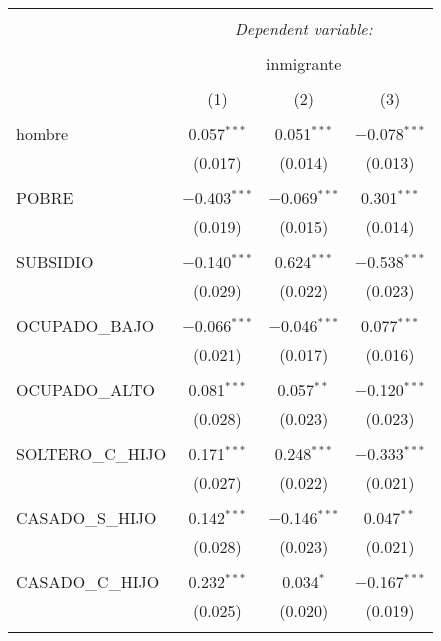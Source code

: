 \documentclass[10pt,a4paper]{book}
\begin{document}
\begin{table}[!htbp] \centering 
  \caption{} 
  \label{} 
\small 
\begin{tabular}{@{\extracolsep{5pt}}lccc} 
\\[-1.8ex]\hline 
\hline \\[-1.8ex] 
 & \multicolumn{3}{c}{\textit{Dependent variable:}} \\ 
\cline{2-4} 
\\[-1.8ex] & \multicolumn{3}{c}{inmigrante} \\ 
\\[-1.8ex] & (1) & (2) & (3)\\ 
\hline \\[-1.8ex] 
 hombre & 0.057$^{***}$ & 0.051$^{***}$ & $-$0.078$^{***}$ \\ 
  & (0.017) & (0.014) & (0.013) \\ 
  & & & \\ 
 POBRE & $-$0.403$^{***}$ & $-$0.069$^{***}$ & 0.301$^{***}$ \\ 
  & (0.019) & (0.015) & (0.014) \\ 
  & & & \\ 
 SUBSIDIO & $-$0.140$^{***}$ & 0.624$^{***}$ & $-$0.538$^{***}$ \\ 
  & (0.029) & (0.022) & (0.023) \\ 
  & & & \\ 
 OCUPADO\_BAJO & $-$0.066$^{***}$ & $-$0.046$^{***}$ & 0.077$^{***}$ \\ 
  & (0.021) & (0.017) & (0.016) \\ 
  & & & \\ 
 OCUPADO\_ALTO & 0.081$^{***}$ & 0.057$^{**}$ & $-$0.120$^{***}$ \\ 
  & (0.028) & (0.023) & (0.023) \\ 
  & & & \\ 
 SOLTERO\_C\_HIJO & 0.171$^{***}$ & 0.248$^{***}$ & $-$0.333$^{***}$ \\ 
  & (0.027) & (0.022) & (0.021) \\ 
  & & & \\ 
 CASADO\_S\_HIJO & 0.142$^{***}$ & $-$0.146$^{***}$ & 0.047$^{**}$ \\ 
  & (0.028) & (0.023) & (0.021) \\ 
  & & & \\ 
 CASADO\_C\_HIJO & 0.232$^{***}$ & 0.034$^{*}$ & $-$0.167$^{***}$ \\ 
  & (0.025) & (0.020) & (0.019) \\ 
  & & & \\ 

\end{tabular}
\end{table}
\end{document}
